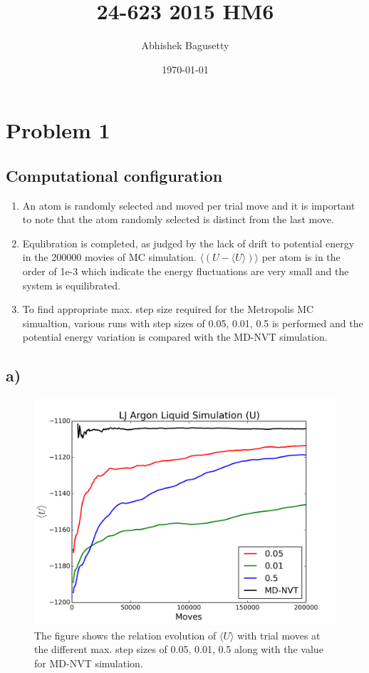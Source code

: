 \documentclass{article}
\author{Abhishek Bagusetty}
\date{\today}
\title{24-623 2015 HM6}
\begin{document}
\maketitle

\section{Problem 1}
\label{sec-1}
\subsection{Computational configuration}
\label{sec-1-1}
\begin{enumerate}
\item An atom is randomly selected and moved per trial move and it is important to note that the atom randomly selected is distinct from the last move.
\item Equlibration is completed, as judged by the lack of drift to potential energy in the 200000 movies of MC simulation. $\big\langle (U -\langle U \rangle) \big\rangle$ per atom is in the order of 1e-3 which indicate the energy fluctuations are very small and the system is equilibrated.
\item To find appropriate max. step size required for the Metropolis MC simualtion, various runs with step sizes of 0.05, 0.01, 0.5 is performed and the potential energy variation is compared with the MD-NVT simulation.
\end{enumerate}

\subsection{a)}
\label{sec-1-2}
\begin{figure}[htb]
\centering
\includegraphics[width=.9\linewidth]{./P1/LJ-md-Ener.png}
\caption{\label{fig:P1a-energy}The figure shows the relation evolution of $\langle U \rangle$ with trial moves at the different max. step sizes of 0.05, 0.01, 0.5 along with the value for MD-NVT simulation.}
\end{figure}
\end{document}
